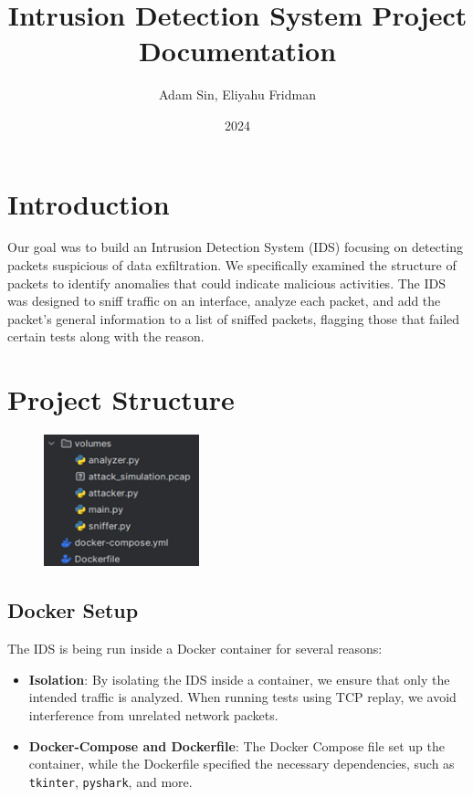 \documentclass{article}
\title{Intrusion Detection System Project Documentation}
\author{Adam Sin, Eliyahu Fridman}
\date{2024}
\begin{document}
\maketitle

\tableofcontents

\section{Introduction}
Our goal was to build an Intrusion Detection System (IDS) focusing on detecting packets suspicious of data exfiltration. We specifically examined the structure of packets to identify anomalies that could indicate malicious activities. The IDS was designed to sniff traffic on an interface, analyze each packet, and add the packet's general information to a list of sniffed packets, flagging those that failed certain tests along with the reason.

\newpage
\section{Project Structure}
\begin{figure}[H]
    \centering
    \includegraphics[width=0.4\textwidth]{structure.png}
\end{figure}

\subsection{Docker Setup}
The IDS is being run inside a Docker container for several reasons:
\begin{itemize}
    \item \textbf{Isolation}: By isolating the IDS inside a container, we ensure that only the intended traffic is analyzed. When running tests using TCP replay, we avoid interference from unrelated network packets.
    \item \textbf{Docker-Compose and Dockerfile}: The Docker Compose file set up the container, while the Dockerfile specified the necessary dependencies, such as \texttt{tkinter}, \texttt{pyshark}, and more.
\end{itemize}
\end{document}

